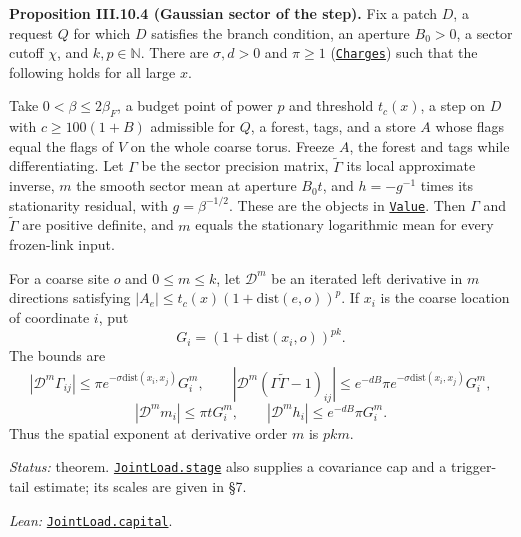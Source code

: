 \documentclass[
  letterpaper,
  11pt]{article}
\begin{document}
\textbf{Proposition III.10.4 (Gaussian sector of the step).} Fix a patch
\(D\), a request \(Q\) for which \(D\) satisfies the branch condition,
an aperture \(B_0>0\), a sector cutoff \(\chi\), and
\(k,p\in\mathbb N\). There are \(\sigma,d>0\) and \(\pi\ge1\)
(\href{https://github.com/yang-mills-group/OpenAI-YM-20261028/blob/3456e5e75cf8d4cd558955a5c7638fba2d68f464/YM/PhysicalNext/V9_JOINT_ENDPOINT_LOAD/Costs.lean\#L34-L42}{\texttt{Charges}})
such that the following holds for all large \(x\).

Take \(0<\beta\le2\beta_F\), a budget point of power \(p\) and threshold
\(t_c(x)\), a step on \(D\) with \(c\ge100(1+B)\) admissible for \(Q\),
a forest, tags, and a store \(A\) whose flags equal the flags of \(V\)
on the whole coarse torus. Freeze \(A\), the forest and tags while
differentiating. Let \(\Gamma\) be the sector precision matrix,
\(\widetilde\Gamma\) its local approximate inverse, \(m\) the smooth
sector mean at aperture \(B_0t\), and \(h=-g^{-1}\) times its
stationarity residual, with \(g=\beta^{-1/2}\). These are the objects in
\href{https://github.com/yang-mills-group/OpenAI-YM-20261028/blob/3456e5e75cf8d4cd558955a5c7638fba2d68f464/YM/PhysicalNext/V9_JOINT_ENDPOINT_LOAD/Costs.lean\#L60-L74}{\texttt{Value}}.
Then \(\Gamma\) and \(\widetilde\Gamma\) are positive definite, and
\(m\) equals the stationary logarithmic mean for every frozen-link
input.

For a coarse site \(o\) and \(0\le m\le k\), let \(\mathcal D^m\) be an
iterated left derivative in \(m\) directions satisfying
\(|A_e|\le t_c(x)(1+\mathrm{dist}(e,o))^p\). If \(x_i\) is the coarse
location of coordinate \(i\), put \[G_i=(1+\mathrm{dist}(x_i,o))^{pk}.\]
The bounds are
\[|\mathcal D^m\Gamma_{ij}|\le\pi e^{-\sigma\mathrm{dist}(x_i,x_j)}G_i^m,\qquad |\mathcal D^m(\Gamma\widetilde\Gamma-1)_{ij}|\le e^{-dB}\pi e^{-\sigma\mathrm{dist}(x_i,x_j)}G_i^m,\]
\[|\mathcal D^m m_i|\le\pi tG_i^m,\qquad |\mathcal D^m h_i|\le e^{-dB}\pi G_i^m.\]
Thus the spatial exponent at derivative order \(m\) is \(pkm\).

\emph{Status:} theorem.
\href{https://github.com/yang-mills-group/OpenAI-YM-20261028/blob/3456e5e75cf8d4cd558955a5c7638fba2d68f464/YM/PhysicalNext/V9_JOINT_ENDPOINT_LOAD/Supply.lean\#L72-L98}{\texttt{JointLoad.stage}}
also supplies a covariance cap and a trigger-tail estimate; its scales
are given in §7.

\emph{Lean:}
\href{https://github.com/yang-mills-group/OpenAI-YM-20261028/blob/3456e5e75cf8d4cd558955a5c7638fba2d68f464/YM/PhysicalNext/V9_JOINT_ENDPOINT_LOAD/Costs.lean\#L92-L157}{\texttt{JointLoad.capital}}.
\end{document}

